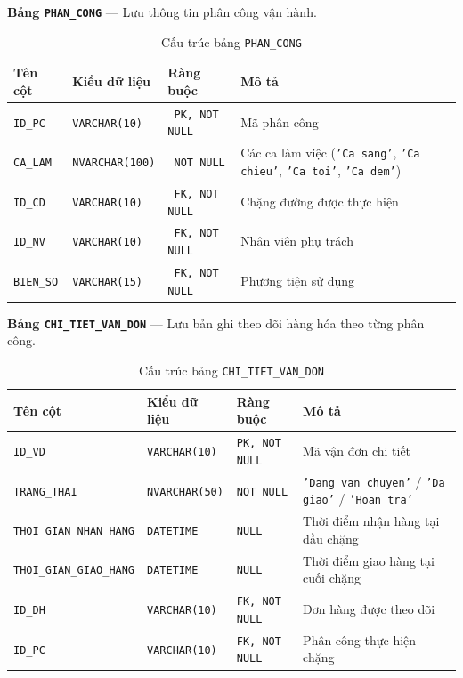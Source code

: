 \documentclass[11pt]{report}
\begin{document}
\noindent\textbf{Bảng \texttt{PHAN\_CONG}} --- Lưu thông tin phân công vận hành.
\begin{table}[H]
    \centering
    \renewcommand{\tabularxcolumn}[1]{m{#1}}
    \begin{tabularx}{\textwidth}{|l|l|l|X|} \hline
        \rowcolor{teal!30}
        \textbf{Tên cột} & \textbf{Kiểu dữ liệu} & \textbf{Ràng buộc} & \textbf{Mô tả} \\ \hline
        \texttt{ID\_PC}   & \texttt{VARCHAR(10)}   & \texttt{ PK, NOT NULL}  & Mã phân công \\ \hline
        \texttt{CA\_LAM}  & \texttt{NVARCHAR(100)} & \texttt{ NOT NULL}      & Các ca làm việc (\texttt{'Ca sang'}, \texttt{'Ca chieu'}, \texttt{'Ca toi'}, \texttt{'Ca dem'}) \\ \hline
        \texttt{ID\_CD}   & \texttt{VARCHAR(10)}   & \texttt{ FK, NOT NULL}  & Chặng đường được thực hiện \\ \hline
        \texttt{ID\_NV}   & \texttt{VARCHAR(10)}   & \texttt{ FK, NOT NULL}  & Nhân viên phụ trách \\ \hline
        \texttt{BIEN\_SO} & \texttt{VARCHAR(15)}   & \texttt{ FK, NOT NULL}  & Phương tiện sử dụng \\ \hline
    \end{tabularx}
    \caption{Cấu trúc bảng \texttt{PHAN\_CONG}}
    \label{tab:str_phancong}
\end{table}

\noindent\textbf{Bảng \texttt{CHI\_TIET\_VAN\_DON}} --- Lưu bản ghi theo dõi hàng hóa theo từng phân công.
\begin{table}[H]
    \centering
    \renewcommand{\tabularxcolumn}[1]{m{#1}}
    \begin{tabularx}{\textwidth}{|l|l|l|>{\raggedright\arraybackslash}X|} \hline
        \rowcolor{teal!30}
        \textbf{Tên cột} & \textbf{Kiểu dữ liệu} & \textbf{Ràng buộc} & \textbf{Mô tả} \\ \hline
        \texttt{ID\_VD}                 & \texttt{VARCHAR(10)}  & \texttt{PK, NOT NULL}  & Mã vận đơn chi tiết \\ \hline
        \texttt{TRANG\_THAI}            & \texttt{NVARCHAR(50)} & \texttt{NOT NULL}      & \texttt{'Dang van chuyen'} / \texttt{'Da giao'} / \texttt{'Hoan tra'} \\ \hline
        \texttt{THOI\_GIAN\_NHAN\_HANG} & \texttt{DATETIME}     & \texttt{NULL}          & Thời điểm nhận hàng tại đầu chặng \\ \hline
        \texttt{THOI\_GIAN\_GIAO\_HANG} & \texttt{DATETIME}     & \texttt{NULL}          & Thời điểm giao hàng tại cuối chặng \\ \hline
        \texttt{ID\_DH}                 & \texttt{VARCHAR(10)}  & \texttt{FK, NOT NULL}  & Đơn hàng được theo dõi \\ \hline
        \texttt{ID\_PC}                 & \texttt{VARCHAR(10)}  & \texttt{FK, NOT NULL}  & Phân công thực hiện chặng \\ \hline
    \end{tabularx}
    \caption{Cấu trúc bảng \texttt{CHI\_TIET\_VAN\_DON}}
    \label{tab:str_ctvd}
\end{table}
\end{document}
